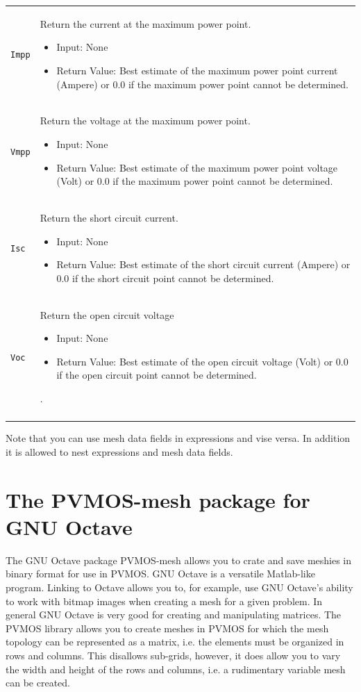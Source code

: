 \documentclass[noshowpacs,preprintnumbers,amsmath,amssymb, letter]{revtex4}
\begin{document}
\begin{longtable}{p{}p{}}
\texttt{Impp}		& Return the current at the maximum power point.
\begin{itemize}
\item Input: None
\item Return Value: Best estimate of the maximum power point current (Ampere) or 0.0 if the maximum power point cannot be determined.
\end{itemize} \\
\texttt{Vmpp}		& Return the voltage at the maximum power point.
\begin{itemize}
\item Input: None
\item Return Value: Best estimate of the maximum power point voltage (Volt) or 0.0 if the maximum power point cannot be determined.
\end{itemize}\\
\texttt{Isc}		& Return the short circuit current.
\begin{itemize}
\item Input: None
\item Return Value: Best estimate of the short circuit current (Ampere) or 0.0 if the short circuit point cannot be determined. 
\end{itemize} \\
\texttt{Voc}		& Return the open circuit voltage
\begin{itemize}
\item Input: None
\item Return Value: Best estimate of the open circuit voltage (Volt) or 0.0 if the open circuit point cannot be determined. 
\end{itemize}. \\
\hline
\\
\end{longtable}
Note that you can use mesh data fields in expressions and vise versa. In addition it is allowed to nest expressions and mesh data fields.

\section{\label{mkpvmosmesh}The PVMOS-mesh package for GNU Octave}
The GNU Octave package PVMOS-mesh allows you to crate and save meshies in binary format for use in PVMOS. GNU Octave is a versatile Matlab-like program. Linking to Octave allows you to, for example, use GNU Octave's ability to work with bitmap images when creating a mesh for a given problem. In general GNU Octave is very good for creating and manipulating matrices. The PVMOS library allows you to create meshes in PVMOS for which the mesh topology can be represented as a matrix, i.e. the elements must be organized in rows and columns. This disallows sub-grids, however, it does allow you to vary the width and height of the rows and columns, i.e. a rudimentary variable mesh can be created. 
\end{document}
